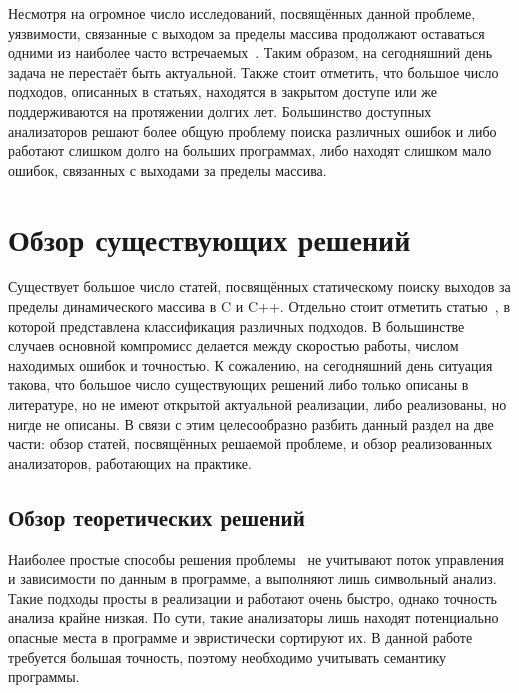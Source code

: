 Несмотря на огромное число исследований, посвящённых данной проблеме,
уязвимости, связанные с выходом за пределы массива продолжают
оставаться одними из наиболее часто встречаемых~\cite{uscert}. Таким
образом, на сегодняшний день задача не перестаёт быть
актуальной. Также стоит отметить, что большое число подходов,
описанных в статьях, находятся в закрытом доступе или же
поддерживаются на протяжении долгих лет. Большинство доступных
анализаторов решают более общую проблему поиска различных ошибок и
либо работают слишком долго на больших программах, либо находят
слишком мало ошибок, связанных с выходами за пределы массива.

\section{Обзор существующих решений}

Существует большое число статей, посвящённых статическому поиску
выходов за пределы динамического массива в C и C++. Отдельно стоит
отметить статью~\cite{shahriar2010classification}, в которой
представлена классификация различных подходов. В большинстве случаев
основной компромисс делается между скоростью работы, числом находимых
ошибок и точностью. К сожалению, на сегодняшний день ситуация такова,
что большое число существующих решений либо только описаны в
литературе, но не имеют открытой актуальной реализации, либо
реализованы, но нигде не описаны. В связи с этим целесообразно разбить
данный раздел на две части: обзор статей, посвящённых решаемой
проблеме, и обзор реализованных анализаторов, работающих на практике.

\subsection{Обзор теоретических решений}

Наиболее простые способы решения
проблемы~\cite{viega2002token,flawfinder} не учитывают поток
управления и зависимости по данным в программе, а выполняют лишь
символьный анализ. Такие подходы просты в реализации и работают очень
быстро, однако точность анализа крайне низкая. По сути, такие
анализаторы лишь находят потенциально опасные места в программе и
эвристически сортируют их. В данной работе требуется большая точность,
поэтому необходимо учитывать семантику программы.


